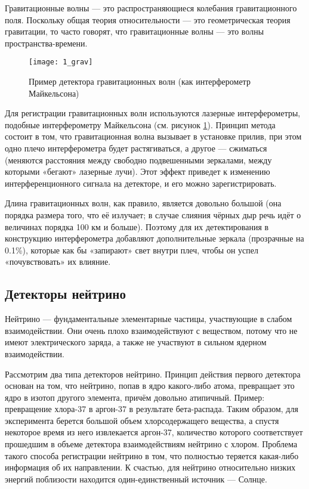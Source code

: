 Гравитационные волны — это распространяющиеся колебания гравитационного поля. Поскольку общая теория относительности — это геометрическая теория гравитации, то часто говорят, что гравитационные волны — это волны пространства-времени.

\begin{figure}[H]
	\centering
	\texttt{[image: 1\_grav]}
	\caption{Пример детектора гравитационных волн (как интерферометр Майкельсона)}
	\label{fig:1_grav}
\end{figure}

Для регистрации гравитационных волн используются лазерные интерферометры, подобные интерферометру Майкельсона (см. рисунок \ref{fig:1_grav}). Принцип метода состоит в том, что гравитационная волна вызывает в установке прилив, при этом одно плечо интерферометра будет растягиваться, а другое --- сжиматься (меняются расстояния между свободно подвешенными зеркалами, между которыми «бегают» лазерные лучи). Этот эффект приведет к изменению интерференционного сигнала на детекторе, и его можно зарегистрировать.

Длина гравитационных волн, как правило, является довольно большой (она порядка размера того, что её излучает; в случае слияния чёрных дыр речь идёт о величинах порядка 100 км и больше). Поэтому для их детектирования в конструкцию интерферометра добавляют дополнительные зеркала (прозрачные на 0.1\%), которые как бы «запирают» свет внутри плеч, чтобы он успел «почувствовать» их влияние.

\subsection{Детекторы нейтрино}

Нейтрино — фундаментальные элементарные частицы, участвующие в слабом взаимодействии. Они очень плохо взаимодействуют с веществом, потому что не имеют электрического заряда, а также не участвуют в сильном ядерном взаимодействии.

Рассмотрим два типа детекторов нейтрино. Принцип действия первого детектора основан на том, что нейтрино, попав в ядро какого-либо атома, превращает это ядро в изотоп другого элемента, причём довольно атипичный. Пример: превращение хлора-37 в аргон-37 в результате бета-распада. Таким образом, для эксперимента берется большой объем хлорсодержащего вещества, а спустя некоторое время из него извлекается аргон-37, количество которого соответствует прошедшим в объеме детектора взаимодействиям нейтрино с хлором. Проблема такого способа регистрации нейтрино в том, что полностью теряется какая-либо информация об их направлении. К счастью, для нейтрино относительно низких энергий поблизости находится один-единственный источник --- Солнце.

